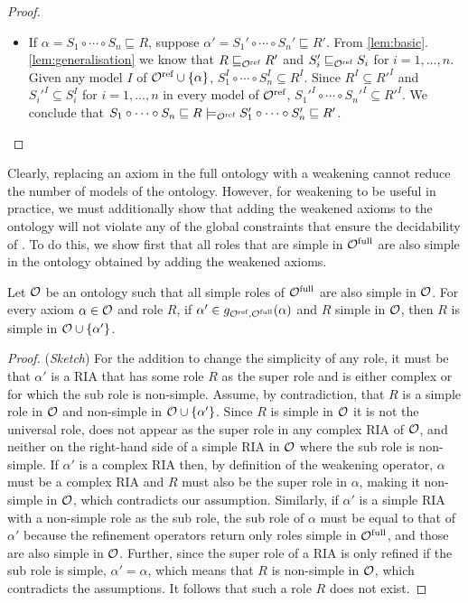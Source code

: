\begin{proof}
\begin{itemize}
    \item If $\alpha = S_1 \circ \cdots \circ S_n \sqsubseteq R$, suppose $\alpha' = S_1' \circ \cdots \circ S_n' \sqsubseteq R'$. From \cref{lem:basic}.\ref{lem:generalisation} we know that $R \sqsubseteq_{\mathcal{O}^\textnormal{ref}} R'$ and $S_i' \sqsubseteq_{\mathcal{O}^\textnormal{ref}} S_i$ for $i = 1, \dots, n$. Given any model $I$ of ${\mathcal{O}^\textnormal{ref}} \cup \{ \alpha \}$, $S_1^I \circ \cdots \circ S_n^I \subseteq R^I$. Since $R^I \subseteq R'^I$ and $S_i'^I \subseteq S_i^I$ for $i = 1, \dots, n$ in every model of ${\mathcal{O}^\textnormal{ref}}$, $S_1'^I \circ \cdots \circ S_n'^I \subseteq R'^I$. We conclude that $S_1 \circ \cdots \circ S_n \sqsubseteq R \models_{\mathcal{O}^\textnormal{ref}} S_1' \circ \cdots \circ S_n' \sqsubseteq R'$.
  \end{itemize}
\end{proof}

Clearly, replacing an axiom in the full ontology with a weakening cannot reduce the number of models of the ontology. However, for weakening to be useful in practice, we must additionally show that adding the weakened axioms to the ontology will not violate any of the global constraints that ensure the decidability of \SROIQ. To do this, we show first that all roles that are simple in ${\mathcal{O}^\textnormal{full}}$ are also simple in the ontology obtained by adding the weakened axioms.

\begin{lemma} \label{lem:simple-roles}
  Let $\mathcal{O}$ be an ontology such that all simple roles of ${\mathcal{O}^\textnormal{full}}$ are also simple in $\mathcal{O}$. For every axiom $\alpha \in \mathcal{O}$ and role $R$, if $\alpha' \in g_{{\mathcal{O}^\textnormal{ref}},{\mathcal{O}^\textnormal{full}}}(\alpha)$ and $R$ simple in $\mathcal{O}$, then $R$ is simple in $\mathcal{O} \cup \{ \alpha' \}$.
\end{lemma}

\begin{proof}(\emph{Sketch})
  For the addition to change the simplicity of any role, it must be that $\alpha'$ is a RIA that has some role $R$ as the super role and is either complex or for which the sub role is non-simple. Assume, by contradiction, that $R$ is a simple role in $\mathcal{O}$ and non-simple in $\mathcal{O} \cup \{ \alpha' \}$. Since $R$ is simple in $\mathcal{O}$ it is not the universal role, does not appear as the super role in any complex RIA of $\mathcal{O}$, and neither on the right-hand side of a simple RIA in $\mathcal{O}$ where the sub role is non-simple. If $\alpha'$ is a complex RIA then, by definition of the weakening operator, $\alpha$ must be a complex RIA and $R$ must also be the super role in $\alpha$, making it non-simple in $\mathcal{O}$, which contradicts our assumption. Similarly, if $\alpha'$ is a simple RIA with a non-simple role as the sub role, the sub role of $\alpha$ must be equal to that of $\alpha'$ because the refinement operators return only roles simple in ${\mathcal{O}^\textnormal{full}}$, and those are also simple in $\mathcal{O}$. Further, since the super role of a RIA is only refined if the sub role is simple, $\alpha' = \alpha$, which means that $R$ is non-simple in $\mathcal{O}$, which contradicts the assumptions. It follows that such a role $R$ does not exist.
\end{proof}

